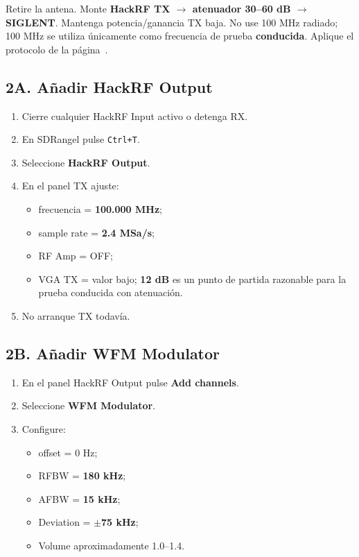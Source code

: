 \begin{alerta}
Retire la antena. Monte \textbf{HackRF TX $\rightarrow$ atenuador 30--60 dB $\rightarrow$ SIGLENT}. Mantenga potencia/ganancia TX baja. No use 100 MHz radiado; 100 MHz se utiliza únicamente como frecuencia de prueba \textbf{conducida}. Aplique el protocolo de la página~\pageref{sec:protocolo-tx}.
\end{alerta}

\subsection{2A. Añadir HackRF Output}

\begin{enumerate}
    \item Cierre cualquier HackRF Input activo o detenga RX.
    \item En SDRangel pulse \texttt{Ctrl+T}.
    \item Seleccione \textbf{HackRF Output}.
    \item En el panel TX ajuste:
    \begin{itemize}
        \item frecuencia = \textbf{100.000 MHz};
        \item sample rate = \textbf{2.4 MSa/s};
        \item RF Amp = OFF;
        \item VGA TX = valor bajo; \textbf{12 dB} es un punto de partida razonable para la prueba conducida con atenuación.
    \end{itemize}
    \item No arranque TX todavía.
\end{enumerate}

\subsection{2B. Añadir WFM Modulator}

\begin{enumerate}
    \item En el panel HackRF Output pulse \textbf{Add channels}.
    \item Seleccione \textbf{WFM Modulator}.
    \item Configure:
    \begin{itemize}
        \item offset = 0 Hz;
        \item RFBW = \textbf{180 kHz};
        \item AFBW = \textbf{15 kHz};
        \item Deviation = \textbf{$\pm$75 kHz};
        \item Volume aproximadamente 1.0--1.4.
    \end{itemize}
\end{enumerate}

